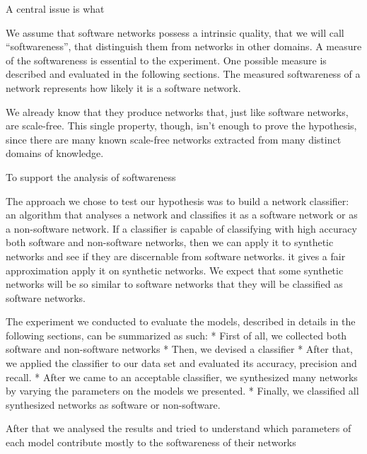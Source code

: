 A central issue is what 

We assume that software networks possess a intrinsic quality, that we will call
``softwareness'', that distinguish them from networks in other domains. A
measure of the softwareness is essential to the experiment. One possible measure
is described and evaluated in the following sections. The measured softwareness
of a network represents how likely it is a software network.

We already know that they
produce networks that, just like software networks, are scale-free. This single
property, though, isn't enough to prove the hypothesis, since there are many
known scale-free networks extracted from many distinct domains of knowledge.

To support the analysis of softwareness


The approach we chose to test our hypothesis was to build a network classifier:
an algorithm that analyses a network and classifies it as a software network or
as a non-software network. If a classifier is capable of classifying with high
accuracy both software and non-software networks, then we can apply it to
synthetic networks and see if they are discernable from software networks.
it gives a fair approximation apply it on synthetic networks. We expect that
some synthetic networks will be so similar to software networks that they will
be classified as software networks.

The experiment we conducted to evaluate the models, described in details in the
following sections, can be summarized as such:
* First of all, we collected both software and non-software networks
* Then, we devised a classifier
* After that, we applied the classifier to our data set and evaluated its
accuracy, precision and recall.
* After we came to an acceptable classifier, we synthesized many networks by
varying the parameters on the models we presented.
* Finally, we classified all synthesized networks as software or non-software.

After that we analysed the results and tried to understand which parameters
of each model contribute mostly to the softwareness of their networks



